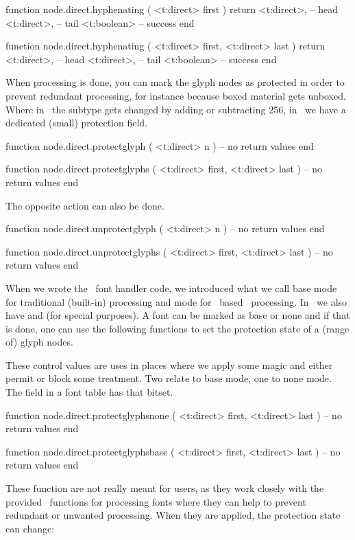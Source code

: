 \starttyping[option=LUA]
function node.direct.hyphenating ( <t:direct> first )
    return
        <t:direct>, -- head
        <t:direct>, -- tail
        <t:boolean> -- success
end

function node.direct.hyphenating ( <t:direct> first, <t:direct> last )
    return
        <t:direct>, -- head
        <t:direct>, -- tail
        <t:boolean> -- success
end
\stoptyping

When processing is done, you can mark the glyph nodes as protected in order to
prevent redundant processing, for instance because boxed material gets unboxed.
Where in \LUATEX\ the subtype gets changed by adding or subtracting 256, in
\LUAMETATEX\ we have a dedicated (small) protection field.

\starttyping[option=LUA]
function node.direct.protectglyph ( <t:direct> n )
    -- no return values
end

function node.direct.protectglyphs ( <t:direct> first, <t:direct> last )
    -- no return values
end
\stoptyping

The opposite action can also be done.

\starttyping[option=LUA]
function node.direct.unprotectglyph ( <t:direct> n )
    -- no return values
end

function node.direct.unprotectglyphs ( <t:direct> first, <t:direct> last )
    -- no return values
end
\stoptyping

When we wrote the \LUA\ font handler code, we introduced what we call \quote
{base} mode for traditional (built-in) processing and  mode for
\LUA\ based \OPENTYPE\ processing. In \CONTEXT\ we also have  and
 (for special purposes). A font can be marked as base or none and if
that is done, one can use the following functions to set the protection state of
a (range of) glyph nodes.


These control values are uses in places where we apply some magic and either
permit or block some treatment. Two relate to base mode, one to none mode. The
 field in a font table has that bitset.

\starttyping[option=LUA]
function node.direct.protectglyphsnone ( <t:direct> first, <t:direct> last )
    -- no return values
end

function node.direct.protectglyphsbase ( <t:direct> first, <t:direct> last )
    -- no return values
end
\stoptyping

These function are not really meant for users, as they work closely with the
provided \LUA\ functions for processing fonts where they can help to prevent
redundant or unwanted processing. When they are applied, the protection state
can change:

